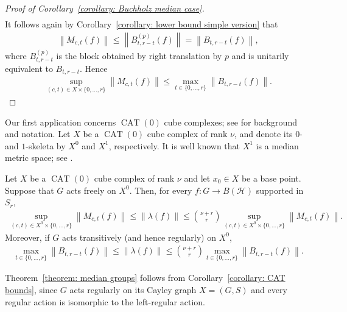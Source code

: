 \documentclass[12pt,reqno]{amsart}
\newcommand{\norm}[1]{\left\|#1\right\|}
\newcommand{\Hil}{\mathcal{H}}
\newcommand{\CAT}{\operatorname{CAT}(0)}
\numberwithin{equation}{section}
\begin{document}
\begin{proof}[Proof of Corollary~\ref{corollary: Buchholz median case}]
\begin{align*}
    \end{align*}
    It follows again by Corollary~\ref{corollary: lower bound simple version} that
    \begin{align*}
        \norm{M_{c,t}(f)}\le \norm{B_{t,r-t}^{(p)}(f)}=\norm{B_{t,r-t}(f)},
    \end{align*}
    where $B_{t,r-t}^{(p)}$ is the block obtained by right translation by $p$ and is unitarily equivalent to $B_{t,r-t}$. Hence
    \begin{align*}
        \sup_{(c,t)\in X\times \{0,\ldots, r\}}\norm{M_{c,t}(f)}\le \max_{t\in \{0,\ldots, r\}}\norm{B_{t,r-t}(f)}.
    \end{align*}
\end{proof}

Our first application concerns $\CAT$ cube complexes; see \cite{Schwer2023CATintroduction} for background and notation. Let $X$ be a $\CAT$ cube complex of rank $\nu$, and denote its $0$- and $1$-skeleta by $X^0$ and $X^1$, respectively. It is well known that $X^1$ is a median metric space; see \cite[Section 2]{Bowditch2014embedding}.
\begin{corollary}\label{corollary: CAT bounds}
    Let $X$ be a $\CAT$ cube complex of rank $\nu$ and let $x_0\in X$ be a base point. Suppose that $G$ acts freely on $X^0$. Then, for every $f:G\to B(\Hil)$ supported in $S_r$,
    \begin{align*}
        \sup_{(c,t)\in X^0\times \{0,\ldots, r\}}\norm{M_{c,t}(f)}\le \norm{\lambda(f)}\le \binom{\nu+r}{r}\sup_{(c,t)\in X^0\times \{0,\ldots, r\}}\norm{M_{c,t}(f)}.
    \end{align*}
    Moreover, if $G$ acts transitively (and hence regularly) on $X^0$,
    \begin{align*}
        \max_{t\in \{0,\ldots, r\}}\norm{B_{t,r-t}(f)}\le \norm{\lambda(f)}\le \binom{\nu+r}{r}\max_{t\in \{0,\ldots, r\}}\norm{B_{t,r-t}(f)}.
    \end{align*}
\end{corollary}
Theorem~\ref{theorem: median groups} follows from Corollary~\ref{corollary: CAT bounds}, since $G$ acts regularly on its Cayley graph $X=(G, S)$ and every regular action is isomorphic to the left-regular action. 
\end{document}
